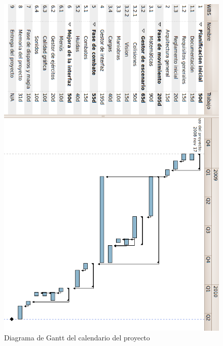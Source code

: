 \begin{figure}[h]
  \centering
  \includegraphics[scale=.5]{./imagenes/Gantt.png}
  \caption{Diagrama de Gantt del calendario del proyecto}
  \label{fig:gantt}
\end{figure}
